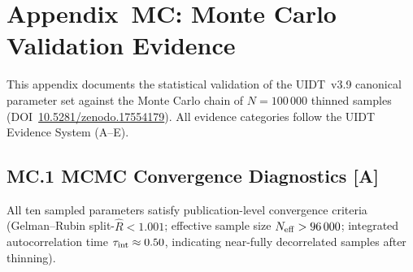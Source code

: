 %
%

\section*{Appendix~MC: Monte Carlo Validation Evidence}
\label{app:mc_evidence}

This appendix documents the statistical validation of the UIDT~v3.9 canonical
parameter set against the Monte Carlo chain of $N=100\,000$ thinned samples
(DOI~\href{https://doi.org/10.5281/zenodo.17554179}{10.5281/zenodo.17554179}).
All evidence categories follow the UIDT Evidence System (A--E).

\subsection*{MC.1 MCMC Convergence Diagnostics \textnormal{\textmd{[A]}}}

All ten sampled parameters satisfy publication-level convergence criteria
(Gelman--Rubin split-$\hat{R}<1.001$; effective sample size $N_{\rm eff}>96\,000$;
integrated autocorrelation time $\tau_{\rm int}\approx 0.50$, indicating
near-fully decorrelated samples after thinning).

